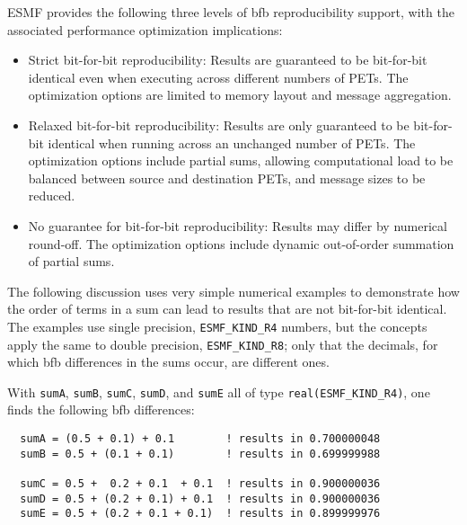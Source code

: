    ESMF provides the following three levels of bfb reproducibility 
   support, with the associated performance optimization implications:
  
   \begin{itemize}
  
   \item Strict bit-for-bit reproducibility: Results are guaranteed to be 
   bit-for-bit identical even when executing across different numbers of PETs. 
   The optimization options are limited to memory layout and message aggregation.
  
   \item Relaxed bit-for-bit reproducibility: Results are only guaranteed to be
   bit-for-bit identical when running across an unchanged number of PETs. The 
   optimization options include partial sums, allowing computational load to 
   be balanced between source and destination PETs, and message sizes to be 
   reduced.
  
   \item No guarantee for bit-for-bit reproducibility: Results may differ by 
   numerical round-off. The optimization options include dynamic out-of-order
   summation of partial sums.
  
   \end{itemize}
  
   The following discussion uses very simple numerical examples to demonstrate
   how the order of terms in a sum can lead to results that are not
   bit-for-bit identical. The examples use single precision,
   {\tt ESMF\_KIND\_R4} numbers, but the concepts apply the same
   to double precision, {\tt ESMF\_KIND\_R8}; only that the decimals, for
   which bfb differences in the sums occur, are different ones.
  
   With {\tt sumA}, {\tt sumB}, {\tt sumC}, {\tt sumD}, and {\tt sumE} all of
   type {\tt real(ESMF\_KIND\_R4)}, one finds the following bfb differences: 

 \begin{verbatim}
  sumA = (0.5 + 0.1) + 0.1        ! results in 0.700000048
  sumB = 0.5 + (0.1 + 0.1)        ! results in 0.699999988
  
  sumC = 0.5 +  0.2 + 0.1  + 0.1  ! results in 0.900000036
  sumD = 0.5 + (0.2 + 0.1) + 0.1  ! results in 0.900000036
  sumE = 0.5 + (0.2 + 0.1 + 0.1)  ! results in 0.899999976
 
\end{verbatim}
 
